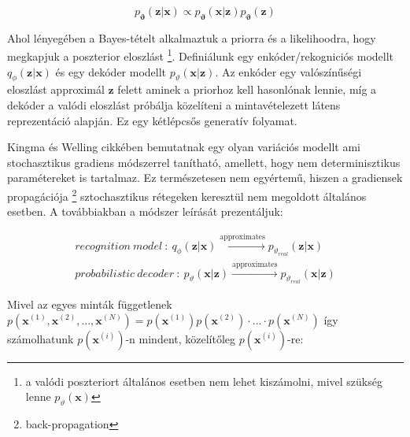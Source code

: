 \documentclass[12pt, english]{article}
\begin{document}
\vspace{4mm}

\begin{equation}
    p_{\boldsymbol{\vartheta}}(\boldsymbol{\bm{z}} | \boldsymbol{\bm{x}}) \propto p_{\boldsymbol{\vartheta}}(\boldsymbol{\bm{x}} | \boldsymbol{\bm{z}}) p_{\boldsymbol{\vartheta}}(\boldsymbol{\bm{z}})
\end{equation}

\vspace{4mm}

\par Ahol lényegében a Bayes-tételt alkalmaztuk a priorra és a likelihoodra, hogy megkapjuk a poszterior eloszlást \footnote{a valódi poszteriort általános esetben nem lehet kiszámolni, mivel szükség lenne $p_{\vartheta}(\bm{x})$}. Definiálunk egy enkóder/rekogniciós modellt $q_{\phi}(\boldsymbol{\bm{z}} | \boldsymbol{\bm{x}})$ és egy dekóder modellt $p_{\vartheta}(\boldsymbol{\bm{x}} | \boldsymbol{\bm{z}})$. Az enkóder egy valószínűségi eloszlást approximál $\boldsymbol{\bm{z}}$ felett aminek a priorhoz kell hasonlónak lennie, míg a dekóder a valódi eloszlást próbálja közelíteni a mintavételezett látens reprezentáció alapján. Ez egy kétlépcsős generatív folyamat. 

\vspace{4mm}

\par Kingma és Welling cikkében \cite{kingma2013auto} bemutatnak egy olyan variációs modellt ami stochasztikus gradiens módszerrel tanítható, amellett, hogy nem determinisztikus paramétereket is tartalmaz. Ez természetesen nem egyértemű, hiszen a gradiensek propagációja \footnote{back-propagation} sztochasztikus rétegeken keresztül nem megoldott általános esetben. A továbbiakban a módszer leírását prezentáljuk:

\vspace{4mm}

\begin{gather*}
    recognition\ model\ :\  q_{\phi}(\bm{z}|\bm{x}) \xrightarrow{\text{approximates}} p_{\vartheta_{real}}(\bm{z} | \bm{x}) \\
    probabilistic\ decoder\ :\ p_{\vartheta}(\bm{x} | \bm{z}) \xrightarrow{\text{approximates}} p_{\vartheta_{real}}(\bm{x} | \bm{z})
\end{gather*}

\vspace{4mm}

\par Mivel az egyes minták függetlenek $p(\bm{x}^{(1)}, \bm{x}^{(2)}, ..., \bm{x}^{(N)}) = p(\bm{x}^{(1)})p(\bm{x}^{(2)})\cdot ... \cdot p(\bm{x}^{(N)})$ így számolhatunk $p(\bm{x}^{(i)})$-n mindent, közelítőleg $p(\bm{x}^{(i)})$-re:
\end{document}
